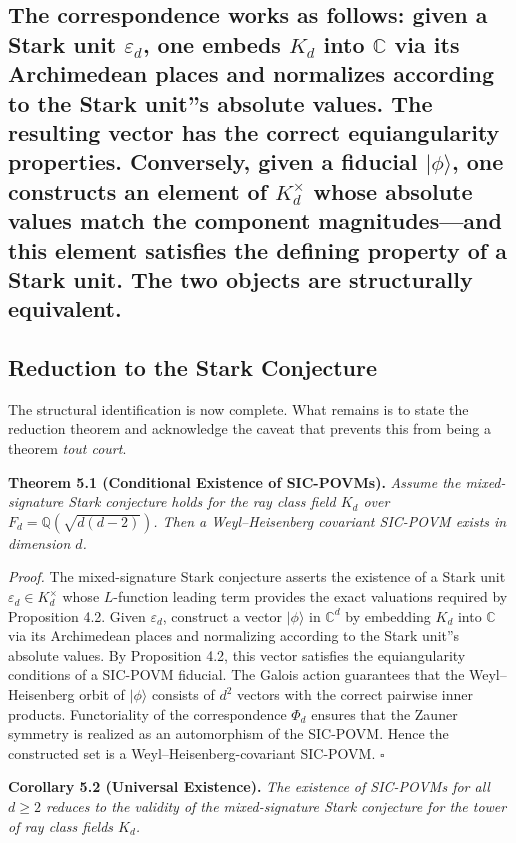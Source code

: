 \documentclass[12pt,a4paper]{article}
\begin{document}
\subsection{The correspondence works as follows: given a Stark unit $\varepsilon_d$, one embeds $K_d$ into $\mathbb{C}$ via its Archimedean places and normalizes according to the Stark unit''s absolute values. The resulting vector has the correct equiangularity properties. Conversely, given a fiducial $|\phi\rangle$, one constructs an element of $K_d^\times$ whose absolute values match the component magnitudes---and this element satisfies the defining property of a Stark unit. The two objects are structurally equivalent.}

\subsection{Reduction to the Stark Conjecture}

The structural identification is now complete. What remains is to state the reduction theorem and acknowledge the caveat that prevents this from being a theorem \emph{tout court}.

\textbf{Theorem 5.1 (Conditional Existence of SIC-POVMs).} \emph{Assume the mixed-signature Stark conjecture holds for the ray class field $K_d$ over $F_d = \mathbb{Q}(\sqrt{d(d-2)})$. Then a Weyl--Heisenberg covariant SIC-POVM exists in dimension $d$.}

\emph{Proof.} The mixed-signature Stark conjecture asserts the existence of a Stark unit $\varepsilon_d \in K_d^\times$ whose $L$-function leading term provides the exact valuations required by Proposition 4.2. Given $\varepsilon_d$, construct a vector $|\phi\rangle$ in $\mathbb{C}^d$ by embedding $K_d$ into $\mathbb{C}$ via its Archimedean places and normalizing according to the Stark unit''s absolute values. By Proposition 4.2, this vector satisfies the equiangularity conditions of a SIC-POVM fiducial. The Galois action guarantees that the Weyl--Heisenberg orbit of $|\phi\rangle$ consists of $d^2$ vectors with the correct pairwise inner products. Functoriality of the correspondence $\Phi_d$ ensures that the Zauner symmetry is realized as an automorphism of the SIC-POVM. Hence the constructed set is a Weyl--Heisenberg-covariant SIC-POVM. $\square$

\textbf{Corollary 5.2 (Universal Existence).} \emph{The existence of SIC-POVMs for all $d \geq 2$ reduces to the validity of the mixed-signature Stark conjecture for the tower of ray class fields $K_d$.}
\end{document}
